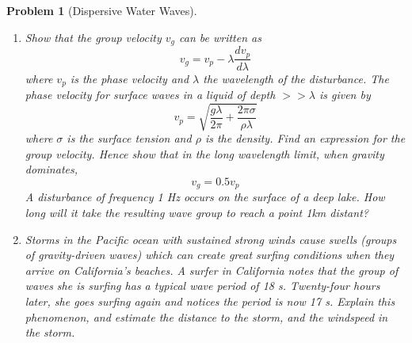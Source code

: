 \documentclass[a4paper]{article}
\theoremstyle{new}
\newtheorem{qns}{Problem}[section]
\begin{document}
\begin{qns}[Dispersive Water Waves]\leavevmode
\begin{enumerate}[label=(\alph*)]
\item Show that the group velocity $v_g$ can be written as
$$v_g=v_p-\lambda\frac{dv_p}{d\lambda}$$
where $v_p$ is the phase velocity and $\lambda$ the wavelength of the disturbance. The phase velocity for surface waves in a liquid of depth $>>\lambda$ is given by
$$v_p=\sqrt{\frac{g\lambda}{2\pi}+\frac{2\pi\sigma}{\rho\lambda}}$$
where $\sigma$ is the surface tension and $\rho$ is the density. Find an expression for the group velocity. Hence show that in the long wavelength limit, when gravity dominates,
$$v_g=0.5v_p$$
A disturbance of frequency 1 Hz occurs on the surface of a deep lake. How long will it take the resulting wave group to reach a point 1km distant?
\item Storms in the Pacific ocean with sustained strong winds cause swells (groups of gravity-driven waves) which can create great surfing conditions when they arrive on California’s beaches. A surfer in California notes that the group of waves she is surfing has a typical wave period of 18 s. Twenty-four hours later, she goes surfing again and notices the period is now 17 s. Explain this phenomenon, and estimate the distance to the storm, and the windspeed in the storm.
\end{enumerate}
\end{qns}
\end{document}
